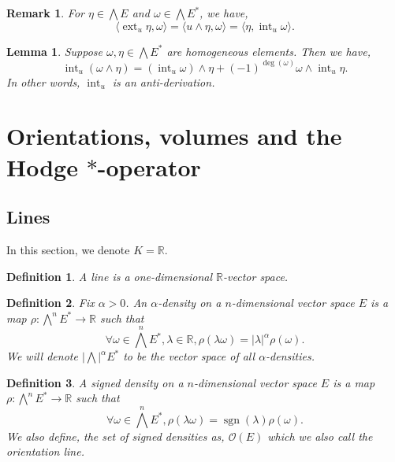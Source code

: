 \documentclass[10pt]{article}
\newtheorem{definition}{Definition}[section]
\newtheorem{lemma}{Lemma}[section]
\newtheorem{remark}{Remark}[section]
\DeclareMathOperator{\sgn}{sgn}
\DeclareMathOperator{\ext}{ext}
\DeclareMathOperator{\inte}{int}
\newcommand{\R}[0]{\mathbb{R}}
\begin{document}
\begin{remark}
  For $\eta\in\bigwedge E$ and $\omega\in\bigwedge E^*$, we have,
  \begin{equation*}
    \langle \ext_u\eta,\omega\rangle = \langle u\wedge\eta,\omega\rangle = \langle \eta,\inte_u\omega\rangle.
  \end{equation*}
\end{remark}

\begin{lemma}
  \label{lemma_10_12}
  Suppose $\omega,\eta\in\bigwedge E^*$ are homogeneous elements. Then we have,
  \begin{equation*}
    \inte_u(\omega\wedge\eta) = (\inte_u\omega)\wedge\eta + (-1)^{\deg(\omega)}\omega\wedge\inte_u\eta.
  \end{equation*}
  In other words, $\inte_u$ is an anti-derivation.
\end{lemma}

\section{Orientations, volumes and the Hodge $\ast$-operator}

\subsection{Lines}
In this section, we denote $K=\R$. 
\begin{definition}
  A line is a one-dimensional $\R$-vector space.
\end{definition}

\begin{definition}
  \label{definition_11_1}
  Fix $\alpha>0$. An $\alpha$-density on a $n$-dimensional vector space $E$ is a map $\rho:\bigwedge^nE^*\to\R$ such that 
  \begin{equation*}
    \forall \omega\in\bigwedge^nE^*,\lambda\in\R, \rho(\lambda\omega) = \vert\lambda\vert^\alpha\rho(\omega).
  \end{equation*}
  We will denote $\vert\bigwedge\vert^\alpha E^*$ to be the vector space of all $\alpha$-densities.
\end{definition}

\begin{definition}
  A signed density on a $n$-dimensional vector space $E$ is a map $\rho:\bigwedge^n E^*\to\R$ such that 
  \begin{equation*}
    \forall \omega\in\bigwedge^nE^*, \rho(\lambda\omega)= \sgn(\lambda)\rho(\omega).
  \end{equation*}
  We also define, the set of signed densities as,
    $\mathcal{O}(E)$ which we also call the orientation line.
\end{definition}
\end{document}
